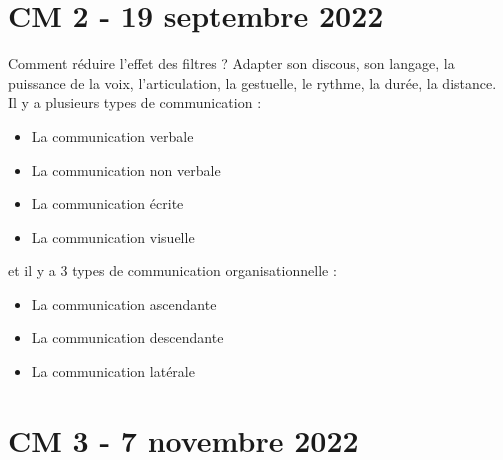 \documentclass[12pt, a4paper]{article}
\begin{document}
\section{CM 2 - 19 septembre 2022}
Comment réduire l'effet des filtres ? Adapter son discous, son langage, la puissance
de la voix, l'articulation, la gestuelle, le rythme, la durée, la distance. \\

Il y a plusieurs types de communication :
\begin{itemize}
	\item La communication verbale
	\item La communication non verbale
	\item La communication écrite
	\item La communication visuelle\\
\end{itemize}

et il y a 3 types de communication organisationnelle :
\begin{itemize}
	\item La communication ascendante
	\item La communication descendante
	\item La communication latérale
\end{itemize}

\newpage

\section{CM 3 - 7 novembre 2022}
\end{document}
